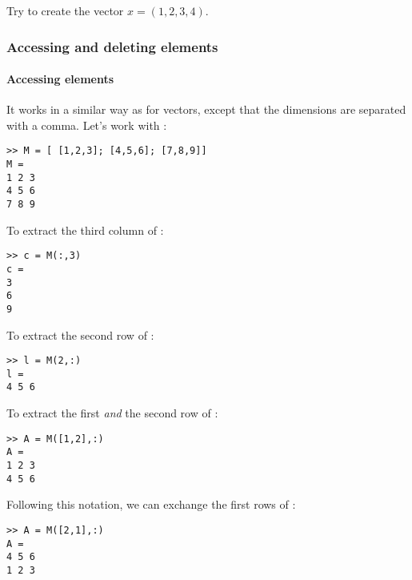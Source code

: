 Try to create the vector $x = (1,2,3,4)$.



\subsubsection{Accessing and deleting elements}

\paragraph{Accessing elements}
It works in a similar way as for vectors, except that the dimensions are separated with a comma.
Let's work with :
\begin{lstlisting}
>> M = [ [1,2,3]; [4,5,6]; [7,8,9]]
M = 
1 2 3
4 5 6
7 8 9
\end{lstlisting}

To extract the third column of :

\begin{lstlisting}
>> c = M(:,3)
c = 
3
6
9
\end{lstlisting}


To extract the second row of :

\begin{lstlisting}
>> l = M(2,:)
l = 
4 5 6
\end{lstlisting}

To extract the first \emph{and} the second row of :
\begin{lstlisting}
>> A = M([1,2],:)
A = 
1 2 3
4 5 6
\end{lstlisting}

Following this notation, we can exchange the first rows of :
\begin{lstlisting}
>> A = M([2,1],:)
A = 
4 5 6
1 2 3
\end{lstlisting}









